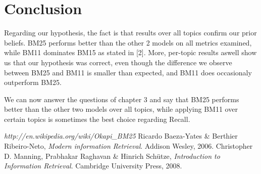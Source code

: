 \documentclass[letterpaper,11pt]{article}
\begin{document}
\section{Conclusion}

Regarding our hypothesis, the fact is that results over all topics confirm our prior beliefs. BM25 performs better than the other 2 models on all metrics examined, while BM11 dominates BM15 as stated in [2]. More, per-topic results aswell show us that our hypothesis was correct, even though the difference we observe between BM25 and BM11 is smaller than expected, and BM11 does occasionaly outperform BM25.

We can now answer the questions of chapter 3 and say that BM25 performs better than the other two models over all topics, while applying BM11 over certain topics is sometimes the best choice regarding Recall.


\begin{thebibliography}{9}
\emph{http://en.wikipedia.org/wiki/Okapi\_BM25}
  Ricardo Baeza-Yates \& Berthier Ribeiro-Neto,
   \emph{Modern information Retrieval}.
  Addison Wesley,
  2006.
  Christopher D. Manning, Prabhakar Raghavan \& Hinrich Schütze,
  \emph{Introduction to Information Retrieval}.
  Cambridge University Press,
  2008.



\end{thebibliography}

    
\end{document}
